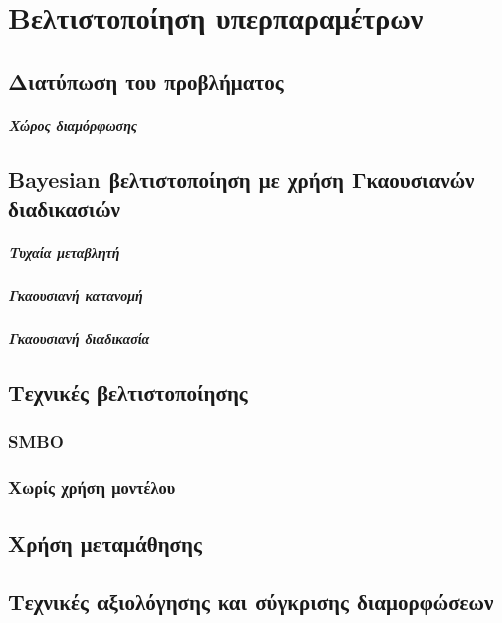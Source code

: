 \documentclass{harvard-thesis}
\begin{document}
\chapter{Βελτιστοποίηση υπερπαραμέτρων} 

\section{Διατύπωση του προβλήματος}

\paragraph{Χώρος διαμόρφωσης}

\section{Bayesian βελτιστοποίηση με χρήση Γκαουσιανών διαδικασιών}
\paragraph{Τυχαία μεταβλητή}
\paragraph{Γκαουσιανή κατανομή}
\paragraph{Γκαουσιανή διαδικασία}
\section{Τεχνικές βελτιστοποίησης}
\subsection{SMBO}
\subsection{Χωρίς χρήση μοντέλου}
\section{Χρήση μεταμάθησης}
\section{Τεχνικές αξιολόγησης και σύγκρισης διαμορφώσεων}
\end{document}
